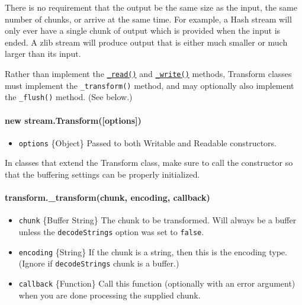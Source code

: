 There is no requirement that the output be the same size as the input,
the same number of chunks, or arrive at the same time. For example, a
Hash stream will only ever have a single chunk of output which is
provided when the input is ended. A zlib stream will produce output that
is either much smaller or much larger than its input.

Rather than implement the
\hyperref[streamux5freadableux5freadux5fsizeux5f1]{\texttt{\_read()}}
and
\hyperref[streamux5fwritableux5fwriteux5fchunkux5fencodingux5fcallbackux5f1]{\texttt{\_write()}}
methods, Transform classes must implement the \texttt{\_transform()}
method, and may optionally also implement the \texttt{\_flush()} method.
(See below.)

\paragraph{new
stream.Transform({[}options{]})}\label{new-stream.transformoptions}

\begin{itemize}
\itemsep1pt\parskip0pt
\item
  \texttt{options} \{Object\} Passed to both Writable and Readable
  constructors.
\end{itemize}

In classes that extend the Transform class, make sure to call the
constructor so that the buffering settings can be properly initialized.

\paragraph{transform.\_transform(chunk, encoding,
callback)}\label{transform.ux5ftransformchunk-encoding-callback}

\begin{itemize}
\itemsep1pt\parskip0pt
\item
  \texttt{chunk} \{Buffer \textbar{} String\} The chunk to be
  transformed. Will always be a buffer unless the \texttt{decodeStrings}
  option was set to \texttt{false}.
\item
  \texttt{encoding} \{String\} If the chunk is a string, then this is
  the encoding type. (Ignore if \texttt{decodeStrings} chunk is a
  buffer.)
\item
  \texttt{callback} \{Function\} Call this function (optionally with an
  error argument) when you are done processing the supplied chunk.
\end{itemize}


